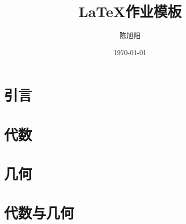 \documentclass[a4paper]{ctexart}
\title{\LaTeX 作业模板}
\author{陈旭阳}
\date{\today}
\begin{document}
    \setcounter{section}{-1}
    \section{引言}
    


    \section{代数}


    \section{几何}


    \section{代数与几何}
\end{document}
